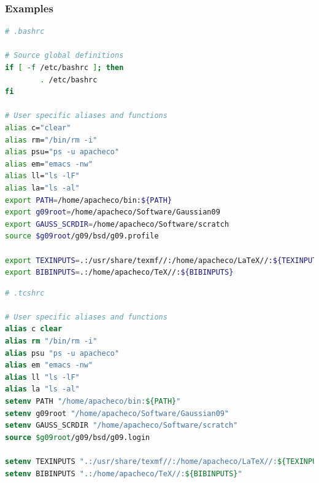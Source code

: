 \documentclass[10pt,t]{beamer}
\begin{document}
\begin{frame}
  \frametitle{Examples}
  \begin{lstlisting}[language=bash,basicstyle=\tiny\ttfamily]
# .bashrc

# Source global definitions
if [ -f /etc/bashrc ]; then
        . /etc/bashrc
fi

# User specific aliases and functions
alias c="clear"
alias rm="/bin/rm -i"
alias psu="ps -u apacheco"
alias em="emacs -nw"
alias ll="ls -lF"
alias la="ls -al"
export PATH=/home/apacheco/bin:${PATH}
export g09root=/home/apacheco/Software/Gaussian09
export GAUSS_SCRDIR=/home/apacheco/Software/scratch
source $g09root/g09/bsd/g09.profile

export TEXINPUTS=.:/usr/share/texmf//:/home/apacheco/LaTeX//:${TEXINPUTS}
export BIBINPUTS=.:/home/apacheco/TeX//:${BIBINPUTS}
  \end{lstlisting}

  \begin{lstlisting}[language=csh,basicstyle=\tiny\ttfamily]
# .tcshrc

# User specific aliases and functions
alias c clear
alias rm "/bin/rm -i"
alias psu "ps -u apacheco"
alias em "emacs -nw"
alias ll "ls -lF"
alias la "ls -al"
setenv PATH "/home/apacheco/bin:${PATH}"
setenv g09root "/home/apacheco/Software/Gaussian09"
setenv GAUSS_SCRDIR "/home/apacheco/Software/scratch"
source $g09root/g09/bsd/g09.login

setenv TEXINPUTS ".:/usr/share/texmf//:/home/apacheco/LaTeX//:${TEXINPUTS}"
setenv BIBINPUTS ".:/home/apacheco/TeX//:${BIBINPUTS}"
  \end{lstlisting}
\end{frame}
\end{document}
